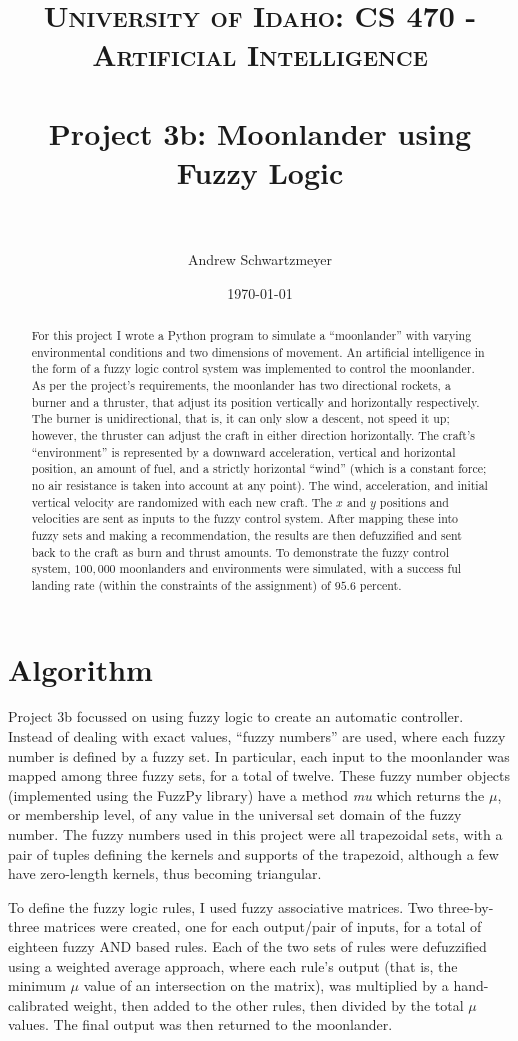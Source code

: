 \documentclass[12pt, article]{scrartcl}
\title{	
\normalfont \normalsize 
\textsc{University of Idaho: CS 470 - Artificial Intelligence} \\ [25pt]
\horrule{0.5pt} \\[0.4cm]
\huge Project 3b: Moonlander using Fuzzy Logic\\
\horrule{2pt} \\[0.5cm]
}
\author{Andrew Schwartzmeyer}
\date{\normalsize\today}
\begin{document}
\maketitle 
\begin{abstract}
For this project I wrote a Python program to simulate a ``moonlander'' with varying environmental conditions and two dimensions of movement. An artificial intelligence in the form of a fuzzy logic control system was implemented to control the moonlander. As per the project's requirements, the moonlander has two directional rockets, a burner and a thruster, that adjust its position vertically and horizontally respectively. The burner is unidirectional, that is, it can only slow a descent, not speed it up; however, the thruster can adjust the craft in either direction horizontally. The craft's ``environment'' is represented by a downward acceleration, vertical and horizontal position, an amount of fuel, and a strictly horizontal ``wind'' (which is a constant force; no air resistance is taken into account at any point). The wind, acceleration, and initial vertical velocity are randomized with each new craft. The $x$ and $y$ positions and velocities are sent as inputs to the fuzzy control system. After mapping these into fuzzy sets and making a recommendation, the results are then defuzzified and sent back to the craft as burn and thrust amounts. To demonstrate the fuzzy control system, $100,000$ moonlanders and environments were simulated, with a success ful landing rate (within the constraints of the assignment) of $95.6$ percent.
\end{abstract}
\pagebreak
\section{Algorithm}
Project 3b focussed on using fuzzy logic to create an automatic controller. Instead of dealing with exact values, ``fuzzy numbers'' are used, where each fuzzy number is defined by a fuzzy set. In particular, each input to the moonlander was mapped among three fuzzy sets, for a total of twelve. These fuzzy number objects (implemented using the FuzzPy library) have a method \emph{mu} which returns the $\mu$, or membership level, of any value in the universal set domain of the fuzzy number. The fuzzy numbers used in this project were all trapezoidal sets, with a pair of tuples defining the kernels and supports of the trapezoid, although a few have zero-length kernels, thus becoming triangular.

To define the fuzzy logic rules, I used fuzzy associative matrices. Two three-by-three matrices were created, one for each output/pair of inputs, for a total of eighteen fuzzy AND based rules. Each of the two sets of rules were defuzzified using a weighted average approach, where each rule's output (that is, the minimum $\mu$ value of an intersection on the matrix), was multiplied by a hand-calibrated weight, then added to the other rules, then divided by the total $\mu$ values. The final output was then returned to the moonlander.
\end{document}
